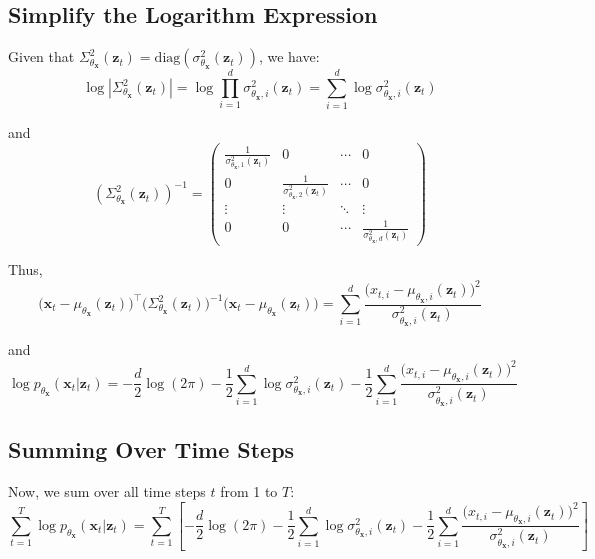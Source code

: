 \subsection*{Simplify the Logarithm Expression}
Given that 
\(\Sigma^2_{\theta_{\bm{x}}}(\bm{z}_{t}) = 
\mathrm{diag}(\sigma^2_{\theta_{\bm{x}}}(\bm{z}_{t}))\), we have:
\begin{equation*}
    \log |\Sigma^2_{\theta_{\bm{x}}}(\bm{z}_{t})| = 
    \log \prod_{i=1}^d \sigma^2_{\theta_{\bm{x}}, i}(\bm{z}_{t}) = 
    \sum_{i=1}^d \log \sigma^2_{\theta_{\bm{x}}, i}(\bm{z}_{t})
\end{equation*}

and
\begin{equation*}
    (\Sigma^2_{\theta_{\bm{x}}}(\bm{z}_{t}))^{-1} = 
    \begin{pmatrix}
    \frac{1}{\sigma^2_{\theta_{\bm{x}}, 1}(\bm{z}_{t})} & 0 & \cdots & 0 \\
    0 & \frac{1}{\sigma^2_{\theta_{\bm{x}}, 2}(\bm{z}_{t})} & \cdots & 0 \\
    \vdots & \vdots & \ddots & \vdots \\
    0 & 0 & \cdots & \frac{1}{\sigma^2_{\theta_{\bm{x}}, d}(\bm{z}_{t})}
    \end{pmatrix}
\end{equation*}

Thus,
\begin{equation*}
    \big(\bm{x}_t - \mu_{\theta_{\bm{x}}}(\bm{z}_{t})\big)^\top 
    \big(\Sigma^2_{\theta_{\bm{x}}}(\bm{z}_{t})\big)^{-1} 
    \big(\bm{x}_t - \mu_{\theta_{\bm{x}}}(\bm{z}_{t})\big) = 
    \sum_{i=1}^d \frac{\big(x_{t,i} - \mu_{\theta_{\bm{x}}, i}(\bm{z}_{t})\big)^2}
    {\sigma^2_{\theta_{\bm{x}}, i}(\bm{z}_{t})}
\end{equation*}

and
\begin{equation}
    \log p_{\theta_{\bm{x}}}(\bm{x}_t | \bm{z}_{t}) = 
    -\frac{d}{2} \log(2\pi) - 
    \frac{1}{2} \sum_{i=1}^d \log \sigma^2_{\theta_{\bm{x}}, i}(\bm{z}_{t}) - 
    \frac{1}{2} \sum_{i=1}^d \frac{\big(x_{t,i} - \mu_{\theta_{\bm{x}}, i}(\bm{z}_{t})\big)^2}
    {\sigma^2_{\theta_{\bm{x}}, i}(\bm{z}_{t})}\label{eq:log_p_theta_x_given_z}
\end{equation}

\subsection*{Summing Over Time Steps}
Now, we sum over all time steps \(t\) from 1 to \(T\):
\begin{equation*}
    \sum_{t=1}^T \log p_{\theta_{\bm{x}}}(\bm{x}_t | \bm{z}_{t}) = 
    \sum_{t=1}^T \left[ -\frac{d}{2} \log(2\pi) - 
    \frac{1}{2} \sum_{i=1}^d \log \sigma^2_{\theta_{\bm{x}}, i}(\bm{z}_{t}) - 
    \frac{1}{2} \sum_{i=1}^d \frac{\big(x_{t,i} - \mu_{\theta_{\bm{x}}, i}(\bm{z}_{t})\big)^2}
    {\sigma^2_{\theta_{\bm{x}}, i}(\bm{z}_{t})} \right]
\end{equation*}

